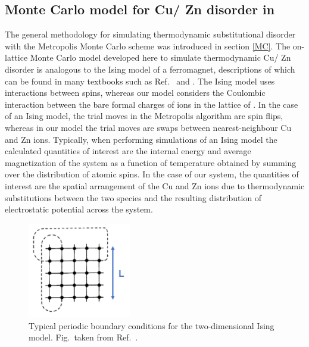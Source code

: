 \documentclass[11pt, twoside]{report}
\begin{document}
\subsection{Monte Carlo model for Cu/ Zn disorder in {\CZTS}}\label{Eris}
The general methodology for simulating thermodynamic substitutional disorder with the Metropolis Monte Carlo scheme was introduced in section \ref{MC}. The on-lattice Monte Carlo model developed here to simulate thermodynamic Cu/ Zn disorder is analogous to the Ising model of a ferromagnet, descriptions of which can be found in many textbooks such as Ref.~ and . 
The Ising model uses interactions between spins, whereas our model considers the Coulombic interaction between the bare formal charges of ions in the lattice of {\CZTS}.
In the case of an Ising model, the trial moves in the Metropolis algorithm are spin flips, whereas in our model the trial moves are swaps between nearest-neighbour Cu and Zn ions. Typically, when performing simulations of an Ising model the calculated quantities of interest are the internal energy and average magnetization of the system as a function of temperature obtained by summing over the distribution of atomic spins. In the case of our system, the quantities of interest are the spatial arrangement of the Cu and Zn ions due to thermodynamic substitutions between the two species and the resulting distribution of electrostatic potential across the system.

\begin{figure}[h!]
  \centering
    \includegraphics[width=0.4\textwidth]{figures/MC_PBCs.png}
    \caption[Typical periodic boundary conditions for the two-dimensional Ising model.]{Typical periodic boundary conditions for the two-dimensional Ising model. Fig.~taken from Ref.~.}
  \label{MC_PBCs}
\end{figure}
\end{document}

